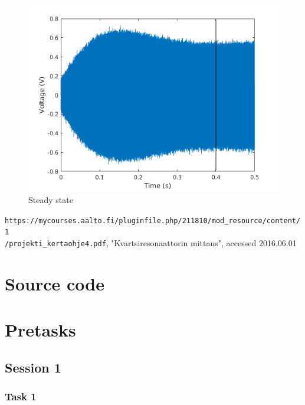 \documentclass[12pt]{article}
\begin{document}
\begin{figure}
	\centering
	\includegraphics[width = \textwidth]{kuvat/steadystate.png}
	\caption{Steady state}
	\label{fig:steady}
\end{figure}

\begin{thebibliography}{1}
 \texttt{https://mycourses.aalto.fi/pluginfile.php/211810/mod\_resource/content/1\\/projekti\_kertaohje4.pdf}, "Kvartsiresonaattorin mittaus", accessed 2016.06.01
\end{thebibliography}

\appendix

\section{Source code}


%

\section{Pretasks}

\subsection{Session 1}

\subsubsection{Task 1}
\end{document}
